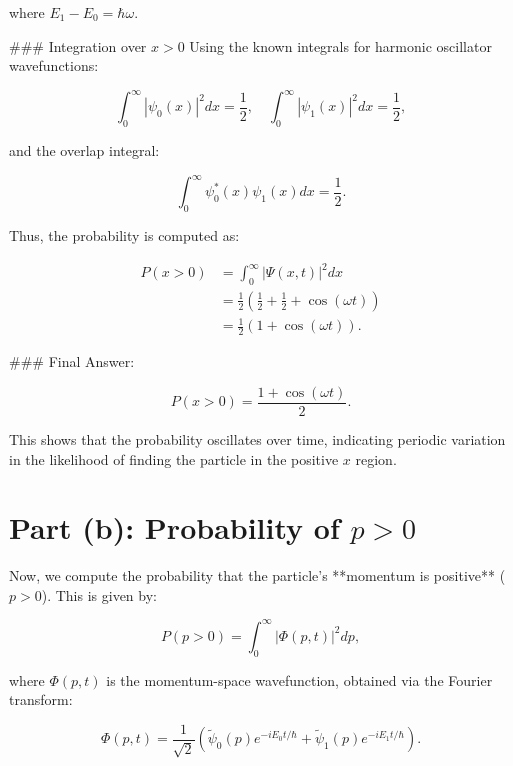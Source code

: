\documentclass[12pt]{article}
\begin{document}
where $E_1 - E_0 = \hbar \omega$.

### Integration over $x > 0$
Using the known integrals for harmonic oscillator wavefunctions:

\begin{equation}
    \int_{0}^{\infty} |\psi_0(x)|^2 dx = \frac{1}{2}, \quad
    \int_{0}^{\infty} |\psi_1(x)|^2 dx = \frac{1}{2},
\end{equation}

and the overlap integral:

\begin{equation}
    \int_{0}^{\infty} \psi_0^*(x) \psi_1(x) dx = \frac{1}{2}.
\end{equation}

Thus, the probability is computed as:

\begin{align}
    P(x > 0) &= \int_{0}^{\infty} |\Psi(x,t)|^2 dx \\
    &= \frac{1}{2} \left( \frac{1}{2} + \frac{1}{2} + \cos(\omega t) \right) \\
    &= \frac{1}{2} \left( 1 + \cos(\omega t) \right).
\end{align}

### Final Answer:

\begin{equation}
    P(x > 0) = \frac{1 + \cos(\omega t)}{2}.
\end{equation}

This shows that the probability oscillates over time, indicating periodic variation in the likelihood of finding the particle in the positive $x$ region.


\section*{Part (b): Probability of \( p > 0 \)}

Now, we compute the probability that the particle's **momentum is positive** ($p > 0$). This is given by:

\begin{equation}
    P(p > 0) = \int_{0}^{\infty} |\Phi(p,t)|^2 dp,
\end{equation}

where $\Phi(p,t)$ is the momentum-space wavefunction, obtained via the Fourier transform:

\begin{equation}
    \Phi(p,t) = \frac{1}{\sqrt{2}} \left( \tilde{\psi}_0(p) e^{-i E_0 t / \hbar} + \tilde{\psi}_1(p) e^{-i E_1 t / \hbar} \right).
\end{equation}
\end{document}
